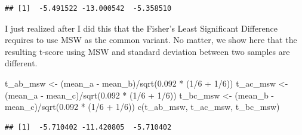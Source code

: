 \documentclass[
]{article}
\newenvironment{Shaded}{\begin{snugshade}}{\end{snugshade}}
\newcommand{\DecValTok}[1]{\textcolor[rgb]{0.00,0.00,0.81}{#1}}
\newcommand{\FloatTok}[1]{\textcolor[rgb]{0.00,0.00,0.81}{#1}}
\newcommand{\FunctionTok}[1]{\textcolor[rgb]{0.00,0.00,0.00}{#1}}
\newcommand{\NormalTok}[1]{#1}
\newcommand{\OtherTok}[1]{\textcolor[rgb]{0.56,0.35,0.01}{#1}}
\newcommand{\SpecialCharTok}[1]{\textcolor[rgb]{0.00,0.00,0.00}{#1}}
\begin{document}
\begin{verbatim}
## [1]  -5.491522 -13.000542  -5.358510
\end{verbatim}

I just realized after I did this that the Fisher's Least Significant
Difference requires to use MSW as the common variant. No matter, we show
here that the resulting t-score using MSW and standard deviation between
two samples are different.

\begin{Shaded}
\begin{Highlighting}[]
\NormalTok{t\_ab\_msw }\OtherTok{\textless{}{-}}\NormalTok{ (mean\_a }\SpecialCharTok{{-}}\NormalTok{ mean\_b)}\SpecialCharTok{/}\FunctionTok{sqrt}\NormalTok{(}\FloatTok{0.092} \SpecialCharTok{*}\NormalTok{ (}\DecValTok{1}\SpecialCharTok{/}\DecValTok{6} \SpecialCharTok{+} \DecValTok{1}\SpecialCharTok{/}\DecValTok{6}\NormalTok{))}
\NormalTok{t\_ac\_msw }\OtherTok{\textless{}{-}}\NormalTok{ (mean\_a }\SpecialCharTok{{-}}\NormalTok{ mean\_c)}\SpecialCharTok{/}\FunctionTok{sqrt}\NormalTok{(}\FloatTok{0.092} \SpecialCharTok{*}\NormalTok{ (}\DecValTok{1}\SpecialCharTok{/}\DecValTok{6} \SpecialCharTok{+} \DecValTok{1}\SpecialCharTok{/}\DecValTok{6}\NormalTok{))}
\NormalTok{t\_bc\_msw }\OtherTok{\textless{}{-}}\NormalTok{ (mean\_b }\SpecialCharTok{{-}}\NormalTok{ mean\_c)}\SpecialCharTok{/}\FunctionTok{sqrt}\NormalTok{(}\FloatTok{0.092} \SpecialCharTok{*}\NormalTok{ (}\DecValTok{1}\SpecialCharTok{/}\DecValTok{6} \SpecialCharTok{+} \DecValTok{1}\SpecialCharTok{/}\DecValTok{6}\NormalTok{))}
\FunctionTok{c}\NormalTok{(t\_ab\_msw, t\_ac\_msw, t\_bc\_msw)}
\end{Highlighting}
\end{Shaded}

\begin{verbatim}
## [1]  -5.710402 -11.420805  -5.710402
\end{verbatim}
\end{document}
